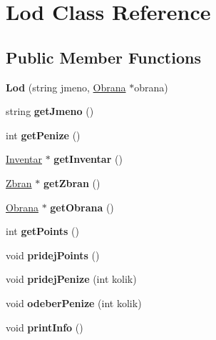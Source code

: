 \hypertarget{class_lod}{}\section{Lod Class Reference}
\label{class_lod}
\subsection*{Public Member Functions}
\begin{DoxyCompactItemize}
\item 
\mbox{\label{class_lod_ab77832907f352461fd14d1ffd7a0c155}} 
{\bfseries Lod} (string jmeno, \hyperlink{class_obrana}{Obrana} $\ast$obrana)
\item 
\mbox{\label{class_lod_a0d251f42f168dd2ecc41f639aa112eb9}} 
string {\bfseries get\+Jmeno} ()
\item 
\mbox{\label{class_lod_ae08487f99cee3157dbc209db672d9378}} 
int {\bfseries get\+Penize} ()
\item 
\mbox{\label{class_lod_a9380c17de214dc682fbff6c17de0f1e5}} 
\hyperlink{class_inventar}{Inventar} $\ast$ {\bfseries get\+Inventar} ()
\item 
\mbox{\label{class_lod_afc901f935e19a19af0eb88f689a9fa74}} 
\hyperlink{class_zbran}{Zbran} $\ast$ {\bfseries get\+Zbran} ()
\item 
\mbox{\label{class_lod_a4107d58c42d45bc994625e4007242506}} 
\hyperlink{class_obrana}{Obrana} $\ast$ {\bfseries get\+Obrana} ()
\item 
\mbox{\label{class_lod_a708d7c986157228b8089b9682e71b033}} 
int {\bfseries get\+Points} ()
\item 
\mbox{\label{class_lod_a55ecddf33b0c1e8ca0070dde2593a364}} 
void {\bfseries pridej\+Points} ()
\item 
\mbox{\label{class_lod_a836eebe8008bd22d2a8ea0bbefd53ba9}} 
void {\bfseries pridej\+Penize} (int kolik)
\item 
\mbox{\label{class_lod_a04e881c2fbcea96016669ac0c60f1aa3}} 
void {\bfseries odeber\+Penize} (int kolik)
\item 
\mbox{\label{class_lod_ac9ab2c9df32876bd8792f0a8b32b476c}} 
void {\bfseries print\+Info} ()
\end{DoxyCompactItemize}
